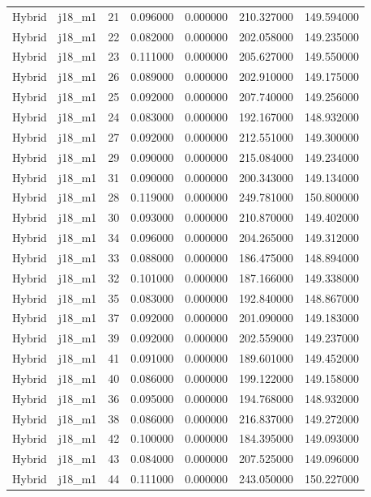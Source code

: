 \begin{tabular}{llrrrrr}
Hybrid & j18_m1 & 21 & 0.096000 & 0.000000 & 210.327000 & 149.594000 \\
Hybrid & j18_m1 & 22 & 0.082000 & 0.000000 & 202.058000 & 149.235000 \\
Hybrid & j18_m1 & 23 & 0.111000 & 0.000000 & 205.627000 & 149.550000 \\
Hybrid & j18_m1 & 26 & 0.089000 & 0.000000 & 202.910000 & 149.175000 \\
Hybrid & j18_m1 & 25 & 0.092000 & 0.000000 & 207.740000 & 149.256000 \\
Hybrid & j18_m1 & 24 & 0.083000 & 0.000000 & 192.167000 & 148.932000 \\
Hybrid & j18_m1 & 27 & 0.092000 & 0.000000 & 212.551000 & 149.300000 \\
Hybrid & j18_m1 & 29 & 0.090000 & 0.000000 & 215.084000 & 149.234000 \\
Hybrid & j18_m1 & 31 & 0.090000 & 0.000000 & 200.343000 & 149.134000 \\
Hybrid & j18_m1 & 28 & 0.119000 & 0.000000 & 249.781000 & 150.800000 \\
Hybrid & j18_m1 & 30 & 0.093000 & 0.000000 & 210.870000 & 149.402000 \\
Hybrid & j18_m1 & 34 & 0.096000 & 0.000000 & 204.265000 & 149.312000 \\
Hybrid & j18_m1 & 33 & 0.088000 & 0.000000 & 186.475000 & 148.894000 \\
Hybrid & j18_m1 & 32 & 0.101000 & 0.000000 & 187.166000 & 149.338000 \\
Hybrid & j18_m1 & 35 & 0.083000 & 0.000000 & 192.840000 & 148.867000 \\
Hybrid & j18_m1 & 37 & 0.092000 & 0.000000 & 201.090000 & 149.183000 \\
Hybrid & j18_m1 & 39 & 0.092000 & 0.000000 & 202.559000 & 149.237000 \\
Hybrid & j18_m1 & 41 & 0.091000 & 0.000000 & 189.601000 & 149.452000 \\
Hybrid & j18_m1 & 40 & 0.086000 & 0.000000 & 199.122000 & 149.158000 \\
Hybrid & j18_m1 & 36 & 0.095000 & 0.000000 & 194.768000 & 148.932000 \\
Hybrid & j18_m1 & 38 & 0.086000 & 0.000000 & 216.837000 & 149.272000 \\
Hybrid & j18_m1 & 42 & 0.100000 & 0.000000 & 184.395000 & 149.093000 \\
Hybrid & j18_m1 & 43 & 0.084000 & 0.000000 & 207.525000 & 149.096000 \\
Hybrid & j18_m1 & 44 & 0.111000 & 0.000000 & 243.050000 & 150.227000 \\

\end{tabular}
